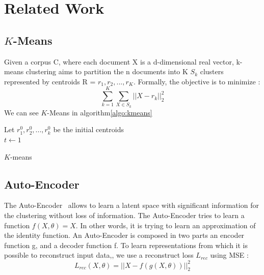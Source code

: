 \section{Related Work}\label{sec:related}
\subsection{$K$-Means}
Given a corpus C, where each document X is a 
d-dimensional real vector, k-means clustering aims to partition the n 
documents into K $S_k$ clusters represented by centroids 
R = {$r_1, r_2, ..., r_K$}.
Formally, the objective is to minimize :
$$
\sum_{k =1 }^K \sum_{X \in S_k} ||X - r_k||_2^2
$$
We can see $K$-Means in algorithm\ref{algo:kmeans}
\begin{algorithm}
  Let $r_1^{0}, r_2^{0} , ..., r_k^{0}$ be the initial centroids\\
  $t \gets 1$\\
  \caption{\label{algo:kmeans}$K$-means}
\end{algorithm}

\subsection{Auto-Encoder}
The Auto-Encoder~\cite{Goodfellow-et-al-2016} allows to learn a latent space with significant
information for the clustering without loss of information.
The Auto-Encoder tries to learn a function $f (X, \theta) = X$. In
other words, it is trying to learn an approximation of the identity
function. An Auto-Encoder is composed in two parts an encoder function
g, and a decoder function f. To learn representations from which it is 
possible to reconstruct input data,, we use a
reconstruct loss $L_{rec}$ using MSE :
\begin{equation}
  L_{rec}(X, \theta) = || X - f(g(X, \theta)) ||_2^2 
\end{equation}

